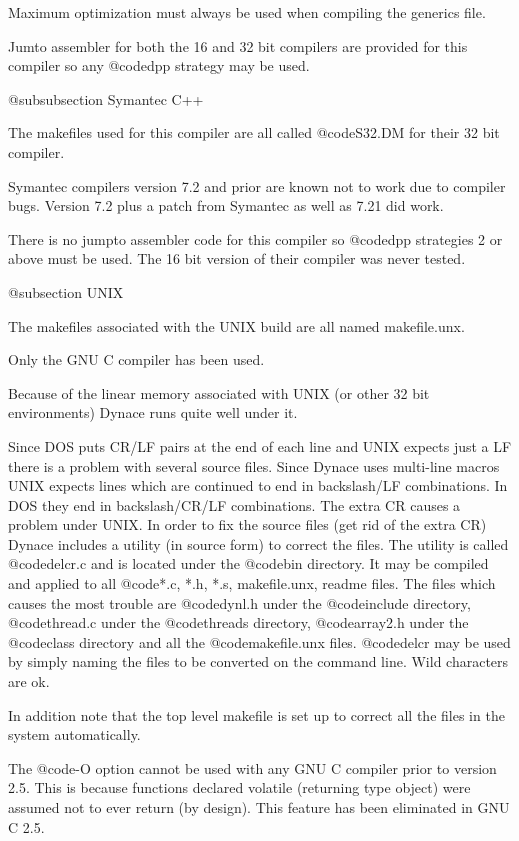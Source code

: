 Maximum optimization must always be used when compiling the generics
file.

Jumto assembler for both the 16 and 32 bit compilers are provided for
this compiler so any @code{dpp} strategy may be used.

@subsubsection Symantec C++

The makefiles used for this compiler are all called 
@code{S32.DM} for their 32 bit compiler.

Symantec compilers version 7.2 and prior are known not to work due to
compiler bugs.  Version 7.2 plus a patch from Symantec as well as 7.21
did work.

There is no jumpto assembler code for this compiler so @code{dpp}
strategies 2 or above must be used.  The 16 bit version of their
compiler was never tested.

@subsection UNIX

The makefiles associated with the UNIX build are all named makefile.unx.

Only the GNU C compiler has been used.

Because of the linear memory associated with UNIX (or other 32 bit
environments) Dynace runs quite well under it.

Since DOS puts CR/LF pairs at the end of each line and UNIX expects just
a LF there is a problem with several source files.  Since Dynace uses
multi-line macros UNIX expects lines which are continued to end in
backslash/LF combinations.  In DOS they end in backslash/CR/LF
combinations.  The extra CR causes a problem under UNIX.  In order to
fix the source files (get rid of the extra CR) Dynace includes a utility
(in source form) to correct the files.  The utility is called
@code{delcr.c} and is located under the @code{bin} directory.  It may be
compiled and applied to all @code{*.c, *.h, *.s, makefile.unx, readme}
files.  The files which causes the most trouble are
@code{dynl.h} under the @code{include} directory, @code{thread.c}
under the @code{threads} directory, @code{array2.h} under the
@code{class} directory and all the @code{makefile.unx} files.
@code{delcr} may be used by simply naming the files to be converted on
the command line.  Wild characters are ok.

In addition note that the top level makefile is set up to correct
all the files in the system automatically.

The @code{-O} option cannot be used with any GNU C compiler prior to
version 2.5.  This is because functions declared volatile (returning
type object) were assumed not to ever return (by design).  This
feature has been eliminated in GNU C 2.5.

